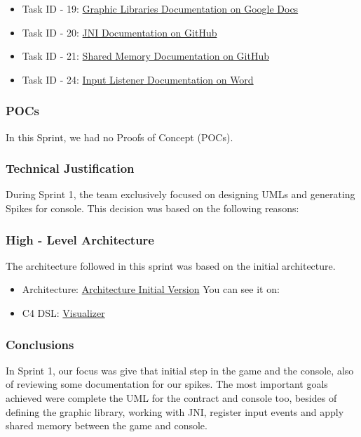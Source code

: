 \begin{itemize}    
    \item Task ID - 19: \href{https://docs.google.com/document/d/1a6wyQA0LM5thyAfOsWnkG-fTLcThvrsVPOGmFcoqkvw/edit?usp=sharing}{Graphic Libraries Documentation on Google Docs}
    \item Task ID - 20: \href{https://github.com/Pending-Name-21/console/tree/vm-spikes/jni_spike}{JNI Documentation on GitHub}
    \item Task ID - 21: \href{https://github.com/Pending-Name-21/console/blob/vm-spikes/shared-memory/README.md}{Shared Memory Documentation on GitHub}
    \item Task ID - 24: \href{https://universidadsalesian-my.sharepoint.com/:w:/g/personal/axel_ayala_9412013_usalesiana_edu_bo/EZlHobuXqW5AmffmDNnGaKYBdpordz1QlVJk88Pe_6S7HQ?e=DymfMq}{Input Listener Documentation on Word}
\end{itemize}

\subsubsection{POCs}

In this Sprint, we had no Proofs of Concept (POCs).

\subsubsection{Technical Justification}

During Sprint 1, the team exclusively focused on designing UMLs and
generating Spikes for console. This decision was based on the following reasons:

\subsubsection{High - Level Architecture}

The architecture followed in this sprint was based on the initial architecture.

\begin{itemize}
    \item Architecture: \href{https://github.com/Pending-Name-21/arquitecture/pull/1/files}{Architecture Initial Version}
    You can see it on: 
    \item C4 DSL: \href{https://structurizr.com/dsl}{Visualizer}
\end{itemize}




\subsubsection{Conclusions}

In Sprint 1, our focus was give that initial step in the game and the console, 
also of reviewing some documentation for our spikes. The most important goals
achieved were complete the UML for the contract and console too, besides of 
defining the graphic library, working with JNI, register input events and apply 
shared memory between the game and console.
